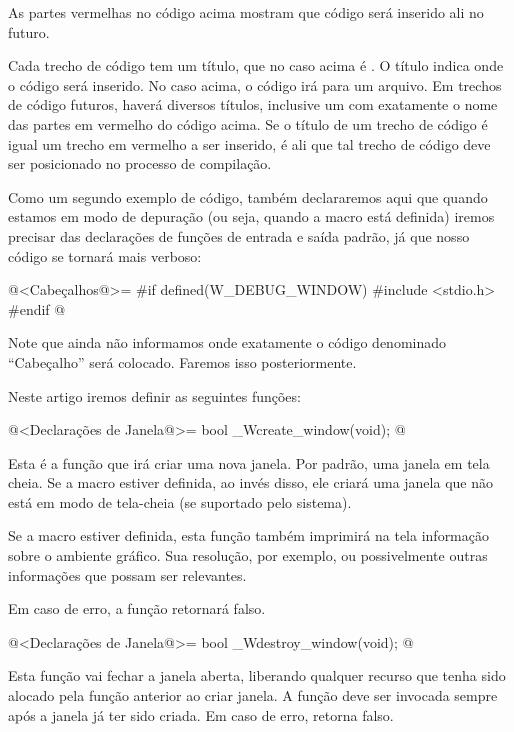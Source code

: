 As partes vermelhas no código acima mostram que código será inserido
ali no futuro.

Cada trecho de código tem um título, que no caso acima
é . O título indica onde o código será
inserido. No caso acima, o código irá para um arquivo. Em trechos de
código futuros, haverá diversos títulos, inclusive um com exatamente o
nome das partes em vermelho do código acima. Se o título de um trecho
de código é igual um trecho em vermelho a ser inserido, é ali que tal
trecho de código deve ser posicionado no processo de compilação.

Como um segundo exemplo de código, também declararemos aqui que quando
estamos em modo de depuração (ou seja, quando a
macro  está definida) iremos precisar das
declarações de funções de entrada e saída padrão, já que nosso código
se tornará mais verboso:

\iniciocodigo
@<Cabeçalhos@>=
#if defined(W_DEBUG_WINDOW)
#include <stdio.h>
#endif
@
\fimcodigo

Note que ainda não informamos onde exatamente o código denominado
``Cabeçalho'' será colocado. Faremos isso posteriormente.


Neste artigo iremos definir as seguintes funções:

\iniciocodigo
@<Declarações de Janela@>=
bool _Wcreate_window(void);
@
\fimcodigo

Esta é a função que irá criar uma nova janela. Por padrão, uma janela
em tela cheia. Se a macro 
estiver definida, ao invés disso, ele criará uma janela que não está
em modo de tela-cheia (se suportado pelo sistema).

Se a macro  estiver definida, esta função
também imprimirá na tela informação sobre o ambiente gráfico. Sua
resolução, por exemplo, ou possivelmente outras informações que possam
ser relevantes.

Em caso de erro, a função retornará falso.

\iniciocodigo
@<Declarações de Janela@>=
bool _Wdestroy_window(void);
@
\fimcodigo

Esta função vai fechar a janela aberta, liberando qualquer recurso que
tenha sido alocado pela função anterior ao criar janela. A função deve
ser invocada sempre após a janela já ter sido criada. Em caso de erro,
retorna falso.

